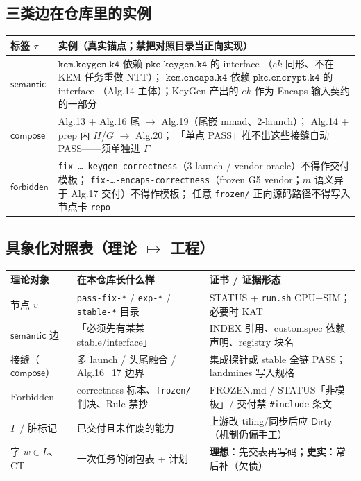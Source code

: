 \documentclass[UTF8,a4paper,11pt]{ctexart}
\theoremstyle{definition}
\theoremstyle{plain}
\theoremstyle{remark}
\numberwithin{figure}{section}
\numberwithin{table}{section}
\begin{document}
\subsection{三类边在仓库里的实例}
\label{sec:replay-edges}

\begin{center}
\small
\begin{tabular}{@{}L{2.4cm}L{11.4cm}@{}}
  \toprule
  标签 $\tau$ & 实例（真实锚点；禁把对照目录当正向实现） \\
  \midrule
  $\mathsf{semantic}$ &
  $\texttt{kem.keygen.k4}$ 依赖 $\texttt{pke.keygen.k4}$ 的 interface
  （$\mathit{ek}$ 同形、不在 KEM 任务重做 NTT）；
  $\texttt{kem.encaps.k4}$ 依赖 $\texttt{pke.encrypt.k4}$ 的 interface
  （Alg.14 主体）；KeyGen 产出的 $\mathit{ek}$ 作为 Encaps 输入契约的一部分 \\
  $\mathsf{compose}$ &
  Alg.13 $+$ Alg.16 尾 $\to$ Alg.19（尾嵌 mmad、2-launch）；
  Alg.14 $+$ prep 内 $H$/$G$ $\to$ Alg.20；
  「单点 PASS」推不出这些接缝自动 PASS——须单独进 $\Gamma$ \\
  $\mathsf{forbidden}$ &
  \texttt{fix-…-keygen-correctness}（3-launch / vendor oracle）不得作交付模板；
  \texttt{fix-…-encaps-correctness}（frozen G5 vendor；$m$ 语义异于 Alg.17 交付）不得作模板；
  任意 \texttt{frozen/} 正向源码路径不得写入节点卡 \texttt{repo} \\
  \bottomrule
\end{tabular}
\end{center}

\subsection{具象化对照表（理论 $\mapsto$ 工程）}
\label{sec:replay-concretize}

\begin{center}
\small
\begin{tabular}{@{}L{3.2cm}L{5.4cm}L{5.2cm}@{}}
  \toprule
  理论对象 & 在本仓库长什么样 & 证书 / 证据形态 \\
  \midrule
  节点 $v$ &
  \texttt{pass-fix-*} / \texttt{exp-*} / \texttt{stable-*} 目录 &
  STATUS + \texttt{run.sh} CPU+SIM；必要时 KAT \\
  $\mathsf{semantic}$ 边 &
  「必须先有某某 stable/interface」 &
  INDEX 引用、customspec 依赖声明、registry 块名 \\
  接缝（$\mathsf{compose}$） &
  多 launch / 头尾融合 / Alg.16·17 边界 &
  集成探针或 stable 全链 PASS；landmines 写入规格 \\
  $\mathrm{Forbidden}$ &
  correctness 标本、\texttt{frozen/} 判决、Rule 禁抄 &
  FROZEN.md / STATUS「非模板」/ 交付禁 \texttt{\#include} 条文 \\
  $\Gamma$ / 脏标记 &
  已交付且未作废的能力 &
  上游改 tiling/同步后应 $\mathsf{Dirty}$（机制仍偏手工） \\
  字 $w\in L$、$\mathrm{CT}$ &
  一次任务的闭包表 + 计划 &
  \textbf{理想}：先交表再写码；\textbf{史实}：常后补（欠债） \\
  \bottomrule
\end{tabular}
\end{center}
\end{document}
